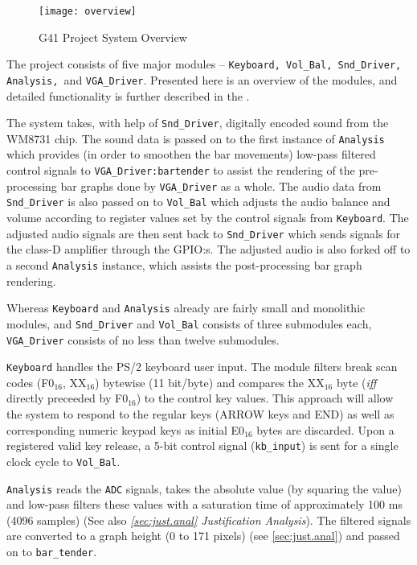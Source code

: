 \begin{figure}[H]
  \centering
  \texttt{[image: overview]}
  \caption{G41 Project System Overview}
  \label{fig:overview}
\end{figure}

The project consists of five major modules -- \texttt{Keyboard, Vol\_Bal, Snd\_Driver, Analysis, }and \texttt{VGA\_Driver}. Presented here is an overview of the modules, and detailed functionality is further described in the \citeD.

The system takes, with help of \texttt{Snd\_Driver}, digitally encoded sound from the WM8731 chip. The sound data is passed on to the first instance of \texttt{Analysis} which provides (in order to smoothen the bar movements) low-pass filtered control signals to \texttt{VGA\_Driver:bartender} to assist the rendering of the pre-processing bar graphs done by \texttt{VGA\_Driver} as a whole. The audio data from \texttt{Snd\_Driver} is also passed on to \texttt{Vol\_Bal} which adjusts the audio balance and volume according to register values set by the control signals from \texttt{Keyboard}. The adjusted audio signals are then sent back to \texttt{Snd\_Driver} which sends signals for the class-D amplifier through the GPIO:s. The adjusted audio is also forked off to a second \texttt{Analysis} instance, which assists the post-processing bar graph rendering.

Whereas \texttt{Keyboard} and \texttt{Analysis} already are fairly small and monolithic modules, and \texttt{Snd\_Driver} and \texttt{Vol\_Bal} consists of three submodules each, \texttt{VGA\_Driver} consists of no less than twelve submodules.

\texttt{Keyboard} handles the PS/2 keyboard user input. The module filters break scan codes (F0$_{16}$, XX$_{16}$) bytewise (11 bit/byte) and compares the XX$_{16}$ byte (\emph{iff} directly preceeded by F0$_{16}$) to the control key values. This approach will allow the system to respond to the regular keys (ARROW keys and END) as well as corresponding numeric keypad keys as initial E0$_{16}$ bytes are discarded. Upon a registered valid key release, a 5-bit control signal (\verb=kb_input=) is sent for a single clock cycle to \texttt{Vol\_Bal}.

\texttt{Analysis} reads the \verb=ADC= signals, takes the absolute value (by squaring the value) and low-pass filters these values with a saturation time of approximately 100 ms (4096 samples) (See also \emph{\ref{sec:just.anal} Justification Analysis}). The filtered signals are converted to a graph height (0 to 171 pixels) (see \ref{sec:just.anal}) and passed on to \verb=bar_tender=.

